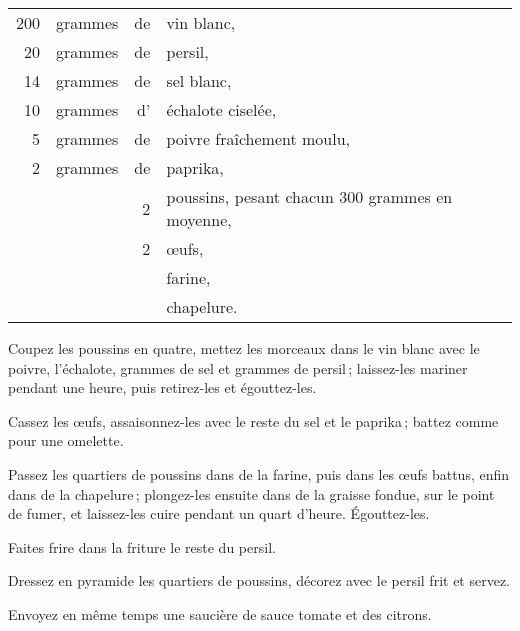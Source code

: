 \footnotesize
\begin{longtable}{rrrp{16em}}
    200 & grammes & de & vin blanc,                                                                       \\
     20 & grammes & de & persil,                                                                          \\
     14 & grammes & de & sel blanc,                                                                       \\
     10 & grammes & d' & échalote ciselée,                                                                \\
      5 & grammes & de & poivre fraîchement moulu,                                                        \\
      2 & grammes & de & paprika,                                                                         \\
        &         &  2 & poussins, pesant chacun 300 grammes en moyenne,                                  \\
        &         &  2 & œufs,                                                                            \\
        &         &    & farine,                                                                          \\
        &         &    & chapelure.                                                                       \\
\end{longtable}
\normalsize

Coupez les poussins en quatre, mettez les morceaux dans le vin blanc avec le
poivre, l'échalote, {\mmm} grammes de sel et {\mmm} grammes de
persil ; laissez-les mariner pendant une heure, puis retirez-les et
égouttez-les.

Cassez les œufs, assaisonnez-les avec le reste du sel et le paprika ; battez
comme pour une omelette.

Passez les quartiers de poussins dans de la farine, puis dans les œufs battus,
enfin dans de la chapelure ; plongez-les ensuite dans de la graisse fondue, sur
le point de fumer, et laissez-les cuire pendant un quart d'heure. Égouttez-les.

Faites frire dans la friture le reste du persil.

Dressez en pyramide les quartiers de poussins, décorez avec le persil frit et
servez.

Envoyez en même temps une saucière de sauce tomate et des citrons.

